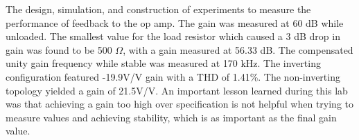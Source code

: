 
The design, simulation, and construction of experiments to measure the performance of feedback to the op amp.  The gain was measured at 60 dB while unloaded. The smallest value for the load resistor which caused a 3 dB drop in gain was found to be 500 $\Omega$, with a gain measured at 56.33 dB. The  compensated unity gain frequency while stable was measured at 170 kHz. The inverting configuration featured -19.9V/V gain with a THD of 1.41\%. The non-inverting topology yielded a gain of 21.5V/V. An important lesson learned during this lab was that achieving a gain too high over specification is not helpful when trying to measure values and achieving stability, which is as important as the final gain value.




